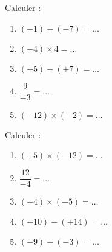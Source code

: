 \begin{minipage}{0.485\textwidth}

    Calculer :
    \begin{enumerate}
        \item
            \( (-1)+(-7)=\ldots\)
        \item
            \( (-4)\times 4=\ldots\)
        \item
            \( (+5)-(+7)=\ldots\)
        \item
            \( \dfrac{ 9 }{ -3 }=\ldots\)
        \item
            \( (-12)\times (-2)=\ldots\)
    \end{enumerate}

\end{minipage}
\begin{minipage}{0.485\textwidth}

    Calculer :
    \begin{enumerate}
        \item
            \( (+5)\times (-12)=\ldots\)
        \item
            \( \dfrac{ 12 }{ -4 }=\ldots\)
        \item
            \( (-4)\times (-5)=\ldots\)
        \item
            \( (+10)-(+14)=\ldots\)
        \item
            \( (-9)+(-3)=\ldots\)
    \end{enumerate}

\end{minipage}

